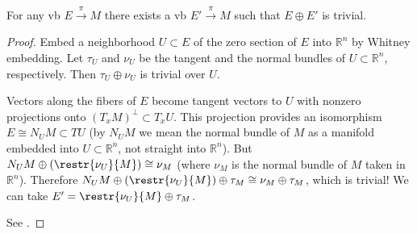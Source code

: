 \documentclass[english,letterpaper]{article}%
\numberwithin{equation}{section}
\numberwithin{figure}{section}
\numberwithin{table}{section}
\theoremstyle{definition}
\theoremstyle{definition}
\theoremstyle{definition}
\theoremstyle{plain}
\theoremstyle{plain}
\theoremstyle{plain}
\theoremstyle{plain}
\theoremstyle{remark}
\theoremstyle{remark}
\begin{document}
\begin{thm}\label{every VB is summand of trivial VB}
    For any \gls{vb} $E\overset{\pi}{\to} M$ there exists a \gls{vb} $E'\overset{\pi}{\to} M$ such that $E\oplus E'$ is trivial.
\end{thm}
\begin{proof}
Embed a neighborhood $U\subset E$ of the zero section of $E$ into $\mathbb{R}^n$ by Whitney embedding. Let $\tau_U$ and $\nu_U$ be the tangent and the normal bundles of $U\subset \mathbb{R}^n$, respectively. Then $\tau_U\oplus \nu_U$ is trivial over $U$.

Vectors along the fibers of $E$ become tangent vectors to $U$ with nonzero projections onto $(T_x M)^\perp\subset T_x U$. This projection provides an isomorphism $E\cong N_U M\subset TU$ (by $N_U M$ we mean the normal bundle of $M$ as a manifold embedded into $U\subset \mathbb{R}^n$, not straight into $\mathbb{R}^n$). But $N_U M\oplus (\restr{\nu_U}{M})\cong \nu_M$ (where $\nu_M$ is the normal bundle of $M$ taken in $\mathbb{R}^n$). Therefore $N_U M\oplus (\restr{\nu_U}{M})\oplus \tau_M\cong \nu_M\oplus \tau_M $, which is trivial! We can take $E'=\restr{\nu_U}{M}\oplus \tau_M$.

See \cite[Thm. II.14.2]{Bredon}.
\end{proof}
\end{document}
